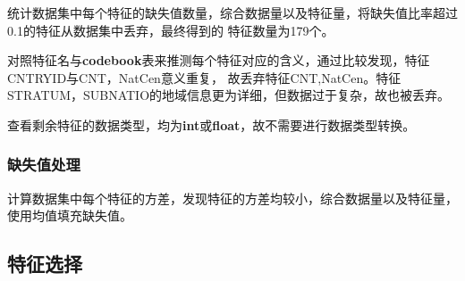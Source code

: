 \documentclass[12pt, a4paper, oneside]{ctexart}
\begin{document}
统计数据集中每个特征的缺失值数量，综合数据量以及特征量，将缺失值比率超过0.1的特征从数据集中丢弃，最终得到的
特征数量为179个。

对照特征名与\textbf{codebook}表来推测每个特征对应的含义，通过比较发现，特征CNTRYID与CNT，NatCen意义重复，
故丢弃特征CNT,NatCen。特征STRATUM，SUBNATIO的地域信息更为详细，但数据过于复杂，故也被丢弃。

查看剩余特征的数据类型，均为\textbf{int}或\textbf{float}，故不需要进行数据类型转换。

\subsubsection{缺失值处理}

计算数据集中每个特征的方差，发现特征的方差均较小，综合数据量以及特征量，使用均值填充缺失值。

\subsection{特征选择}
\end{document}
